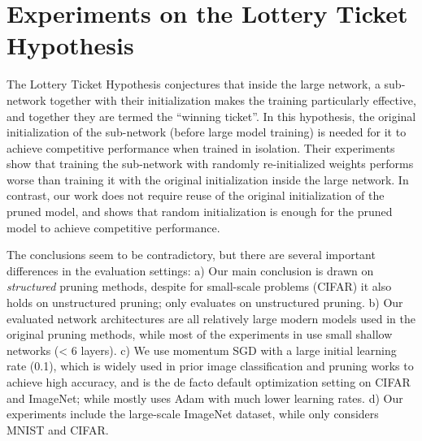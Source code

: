 \section{Experiments on the Lottery Ticket Hypothesis \citep{lottery}}
\label{ap:lottery}

The Lottery Ticket Hypothesis \citep{lottery} conjectures that inside the large network, a sub-network together with their initialization makes the training particularly effective, and together they are termed the ``winning ticket''. In this hypothesis, the original initialization of the sub-network (before large model training) is needed for it to achieve competitive performance when trained in isolation. Their experiments show that training the sub-network with randomly re-initialized weights performs worse than training it with the original initialization inside the large network. In contrast, our work does not require reuse of the original initialization of the pruned model, and shows that random initialization is enough for the pruned model to achieve competitive performance. 

The conclusions seem to be contradictory, but there are several important differences in the evaluation settings: a) Our main conclusion is drawn on \emph{structured} pruning methods, despite for small-scale problems (CIFAR) it also holds on unstructured pruning; \citet{lottery} only evaluates on unstructured pruning. b) Our evaluated network architectures are all relatively large modern models used in the original pruning methods, while most of the experiments in \citet{lottery} use small shallow networks (< 6 layers). c) We use momentum SGD with a large initial learning rate (0.1), which is widely used in prior image classification \citep{resnet, densenet} and pruning works \citep{li2016pruning, liu2017learning, he2017channel, luo2017thinet, he2018sfp, huang2018data} to achieve high accuracy, and is the de facto default optimization setting on CIFAR and ImageNet; while \citet{lottery} mostly uses Adam with much lower learning rates. d) Our experiments include the large-scale ImageNet dataset, while \citet{lottery} only considers MNIST and CIFAR.

